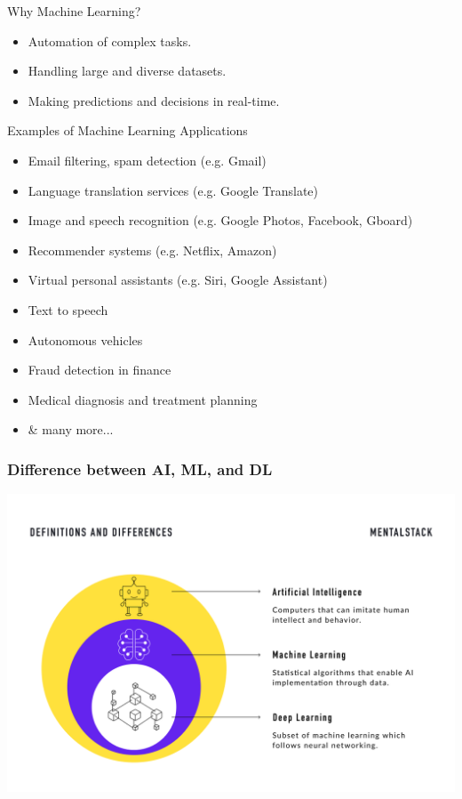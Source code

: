 \documentclass{beamer}
\begin{document}
\begin{frame}{Why Machine Learning?}
  \begin{itemize}[<+->]
    \item Automation of complex tasks.
    \item Handling large and diverse datasets.
    \item Making predictions and decisions in real-time.
  \end{itemize}
\end{frame}

\begin{frame}{Examples of Machine Learning Applications}
  \begin{itemize}[<+->]
    \item Email filtering, spam detection (e.g. Gmail)
    \item Language translation services (e.g. Google Translate)
    \item Image and speech recognition (e.g. Google Photos, Facebook, Gboard)
    \item Recommender systems (e.g. Netflix, Amazon)
    \item Virtual personal assistants (e.g. Siri, Google Assistant)
    \item Text to speech
    \item Autonomous vehicles
    \item Fraud detection in finance
    \item Medical diagnosis and treatment planning
    \item \& many more...
  \end{itemize}
\end{frame}

\begin{frame}
  \frametitle{Difference between AI, ML, and DL}
  \begin{center}
    \includegraphics[width=\textwidth, height=\textheight, keepaspectratio]{ai-ml-dl.png}
  \end{center}
\end{frame}
\end{document}
